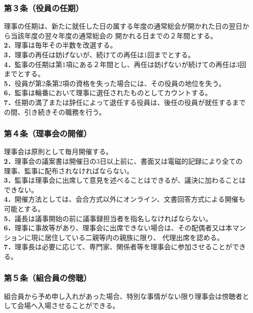\documentclass[12pt,uplatex]{jsarticle}
\begin{document}
\subsubsection*{ 第３条（役員の任期）}
理事の任期は、新たに就任した日の属する年度の通常総会が開かれた日の翌日から当該年度の翌々年度の通常総会の
開かれる日までの２年間とする。\\
\textbf{2．}理事は毎年その半数を改選する。\\
\textbf{3．}理事の再任は妨げないが、続けての再任は1回までとする。\\
\textbf{4．}監事の任期は第1項にある２年間とし、再任は妨げないが続けての再任は3回までとする。\\
\textbf{5．}役員が第2条第2項の資格を失った場合には、その役員の地位を失う。\\
\textbf{6．}監事は輪番において理事に選任されたものとしてカウントする。\\
\textbf{7．}任期の満了または辞任によって退任する役員は、後任の役員が就任するまでの間、引き続きその職務を行う。
\subsubsection*{ 第４条（理事会の開催）}
理事会は原則として毎月開催する。\\
\textbf{2．}理事会の議案書は開催日の3日以上前に、書面又は電磁的記録により全ての理事、監事に配布されなければならない。\\
\textbf{3．}監事は理事会に出席して意見を述べることはできるが、議決に加わることはできない。\\
\textbf{4．}開催方法としては、会合方式以外にオンライン、文書回答方式による開催も可能とする。\\
\textbf{5．}議長は議事開始の前に議事録担当者を指名しなければならない。\\
\textbf{6．}理事に事故等があり、理事会に出席できない場合は、その配偶者又は本マンションに現に居住している二親等内の親族に限り、
代理出席を認める。\\
\textbf{7．}理事長は必要に応じて、専門家、関係者等を理事会に参加させることができる。
\subsubsection*{ 第５条（組合員の傍聴）}
組合員から予め申し入れがあった場合、特別な事情がない限り理事会は傍聴者として会場へ入場させることができる。
\end{document}
